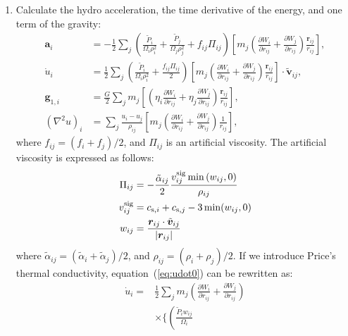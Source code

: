 \documentclass[fleqn,dvipdfmx]{article}
\begin{document}
\begin{enumerate}
\item Calculate the hydro acceleration, the time derivative of the
  energy, and one term of the gravity:
  \begin{align}
    \bm{a}_i &= - \frac{1}{2} \sum_j \left(
    \frac{\tilde{P}_i}{\Omega_i \rho_i^2} +
    \frac{\tilde{P}_j}{\Omega_j \rho_j^2} + f_{ij} \Pi_{ij} \right)
    \left[ m_j \left( \frac{\partial W_i}{\partial r_{ij}} +
      \frac{\partial W_j}{\partial r_{ij}} \right)
      \frac{\bm{r}_{ij}}{r_{ij}} \right], \\
    \dot{u}_i &= \frac{1}{2} \sum_j \left( \frac{\tilde{P}_i}{\Omega_i
      \rho_i^2} + \frac{f_{ij} \Pi_{ij}}{2} \right)
    \left[ m_j \left( \frac{\partial W_i}{\partial r_{ij}} +
      \frac{\partial W_j}{\partial r_{ij}} \right)
      \frac{\bm{r}_{ij}}{r_{ij}} \right] \cdot
    \tilde{\bm{v}}_{ij}, \label{eq:udot0} \\
    \bm{g}_{1,i} &= \frac{G}{2} \sum_j m_j \left[ \left( \eta_i
      \frac{\partial W_{i}}{\partial r_{ij}} + \eta_j \frac{\partial
        W_{j}}{\partial r_{ij}} \right) \frac{\bm{r}_{ij}}{r_{ij}}
      \right], \\    
    \left( \nabla^2 u \right)_i &= \sum_j \frac{u_i - u_j}{\rho_{ij}}
    \left[ m_j \left( \frac{\partial W_i}{\partial r_{ij}} +
      \frac{\partial W_j}{\partial r_{ij}} \right)
      \frac{1}{r_{ij}} \right],
  \end{align}
  where $f_{ij}=(f_i+f_j)/2$, and $\Pi_{ij}$ is an artificial
  viscosity. The artificial viscosity is expressed as follows:
  \begin{align}
    \Pi_{ij} &= - \frac{\tilde{\alpha}_{ij}}{2} \frac{v_{ij}^{\rm sig}
      \min\left(w_{ij},0\right)}{\rho_{ij}} \\
    v_{ij}^{\rm sig} &= c_{{\rm s},i} + c_{{\rm s},j} - 3
    \min(w_{ij},0) \\
    w_{ij} &= \frac{\bm{r}_{ij} \cdot
      \tilde{\bm{v}}_{ij}}{|\bm{r}_{ij}|}
  \end{align}
  where $\tilde{\alpha}_{ij}=(\tilde{\alpha}_i+\tilde{\alpha}_j)/2$,
  and $\rho_{ij}=(\rho_i+\rho_j)/2$. If we introduce Price's thermal
  conductivity, equation~(\ref{eq:udot0}) can be rewritten as:
  \begin{align}
    \dot{u}_i = &\frac{1}{2} \sum_j m_j \left( \frac{\partial
      W_i}{\partial r_{ij}} + \frac{\partial W_j}{\partial r_{ij}}
    \right) \nonumber \\ 
    &\times \Biggl\{ \left( \frac{\tilde{P}_i w_{ij}}{\Omega_i
}
\end{align}
\end{enumerate}
\end{document}
